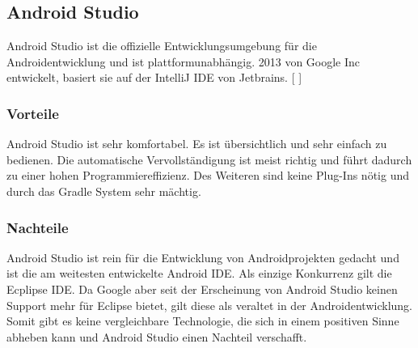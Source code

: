 \documentclass[FIPLY_base.tex]{subfiles}
\begin{document}
	\subsection{Android Studio}
	Android Studio ist die offizielle Entwicklungsumgebung für die Androidentwicklung und ist plattformunabhängig. 2013 von Google Inc entwickelt, basiert sie auf der IntelliJ IDE von Jetbrains.
	[ \cite{androidstudiodef}]  
	\subsubsection{Vorteile}
	Android Studio ist sehr komfortabel. Es ist übersichtlich und sehr einfach zu bedienen. Die automatische Vervollständigung ist meist richtig und führt dadurch zu einer hohen Programmiereffizienz. Des Weiteren sind keine Plug-Ins nötig und durch das Gradle System sehr mächtig.
	\subsubsection{Nachteile}
	Android Studio ist rein für die Entwicklung von Androidprojekten gedacht und ist die am weitesten entwickelte Android IDE. Als einzige \grqq{}Konkurrenz\grqq{} gilt die Ecplipse IDE. Da Google aber seit der Erscheinung von Android Studio keinen Support mehr für Eclipse bietet, gilt diese als veraltet in der Androidentwicklung. Somit gibt es keine vergleichbare Technologie, die sich in einem positiven Sinne abheben kann und Android Studio einen Nachteil verschafft.
	\ \\
\end{document}
